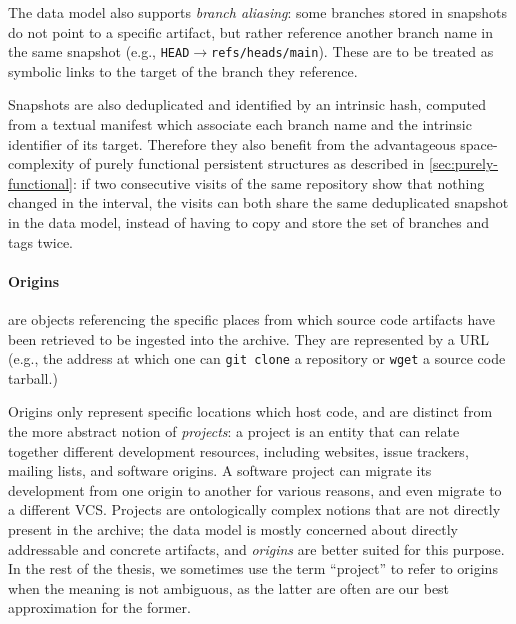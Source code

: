 The data model also supports \emph{branch aliasing}: some branches stored in
snapshots do not point to a specific artifact, but rather reference another
branch name in the same snapshot (e.g.,
\texttt{HEAD}$\to$\texttt{refs/heads/main}). These are to be treated as
symbolic links to the target of the branch they reference.

Snapshots are also deduplicated and identified by an intrinsic hash, computed
from a textual manifest which associate each branch name and the intrinsic
identifier of its target. Therefore they also benefit from the advantageous
space-complexity of purely functional persistent structures as described in
\cref{sec:purely-functional}: if two consecutive visits of the same repository
show that nothing changed in the interval, the visits can both share the same
deduplicated snapshot in the data model, instead of having to copy and store
the set of branches and tags twice.


\begin{figure}\centering
{}
\end{figure}
\paragraph{\textbf{Origins}} are objects referencing the specific places from
which source code artifacts have been retrieved to be ingested into the
archive.  They are represented by a URL (e.g., the address at which
one can \texttt{git clone} a repository or \texttt{wget} a source code
tarball.)

Origins only represent specific locations which host code, and are distinct
from the more abstract notion of \emph{projects}: a project is an entity that
can relate together different development resources, including websites, issue
trackers, mailing lists, and software origins. A software project can migrate
its development from one origin to another for various reasons, and even
migrate to a different \gls{VCS}. Projects are ontologically complex notions
that are not directly present in the archive; the data model is mostly
concerned about directly addressable and concrete artifacts, and \emph{origins}
are better suited for this purpose. In the rest of the thesis, we sometimes use
the term ``project'' to refer to origins when the meaning is not ambiguous, as
the latter are often are our best approximation for the former.

